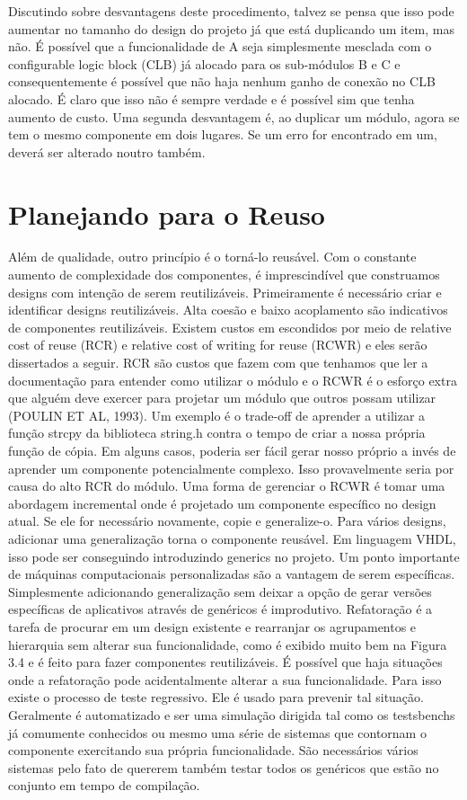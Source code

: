 Discutindo sobre desvantagens deste procedimento, talvez se pensa que isso pode aumentar no tamanho do design do projeto já que está duplicando um item, mas não. É possível que a funcionalidade de A seja simplesmente mesclada com o configurable logic block (CLB) já alocado para os sub-módulos B e C e consequentemente é possível que não haja nenhum ganho de conexão no CLB alocado. É claro que isso não é sempre verdade e é possível sim que tenha aumento de custo. Uma segunda desvantagem é, ao duplicar um módulo, agora se tem o mesmo componente em dois lugares. Se um erro for encontrado em um, deverá ser alterado noutro também.


\section{Planejando para o Reuso}
Além de qualidade, outro princípio é o torná-lo reusável. Com o constante aumento de complexidade dos componentes, é imprescindível que construamos designs com intenção de serem reutilizáveis. Primeiramente é necessário criar e identificar designs reutilizáveis. Alta coesão e baixo acoplamento são indicativos de componentes reutilizáveis. Existem custos em escondidos por meio de relative cost of reuse (RCR) e relative cost of writing for reuse (RCWR) e eles serão dissertados a seguir.
RCR são custos que fazem com que tenhamos que ler a documentação para entender como utilizar o módulo e o RCWR é o esforço extra que alguém deve exercer para projetar um módulo que outros possam utilizar (POULIN ET AL, 1993). Um exemplo é o trade-off de aprender a utilizar a função strcpy da biblioteca string.h contra o tempo de criar a nossa própria função de cópia. Em alguns casos, poderia ser fácil gerar nosso próprio a invés de aprender um componente potencialmente complexo. Isso provavelmente seria por causa do alto RCR do módulo.
Uma forma de gerenciar o RCWR é tomar uma abordagem incremental onde é projetado um componente específico no design atual. Se ele for necessário novamente, copie e generalize-o. Para vários designs, adicionar uma generalização torna o componente reusável. Em linguagem VHDL, isso pode ser conseguindo introduzindo generics no projeto. Um ponto importante de máquinas computacionais personalizadas são a vantagem de serem específicas. Simplesmente adicionando generalização sem deixar a opção de gerar versões específicas de aplicativos através de genéricos é improdutivo. Refatoração é a tarefa de procurar em um design existente e rearranjar os agrupamentos e hierarquia sem alterar sua funcionalidade, como é exibido muito bem na Figura 3.4 e é feito para fazer componentes reutilizáveis. É possível que haja situações onde a refatoração pode acidentalmente alterar a sua funcionalidade. Para isso existe o processo de teste regressivo. Ele é usado para prevenir tal situação. Geralmente é automatizado e ser uma simulação dirigida tal como os testsbenchs já comumente conhecidos ou mesmo uma série de sistemas que contornam o componente exercitando sua própria funcionalidade. São necessários vários sistemas pelo fato de quererem também testar todos os genéricos que estão no conjunto em tempo de compilação.


